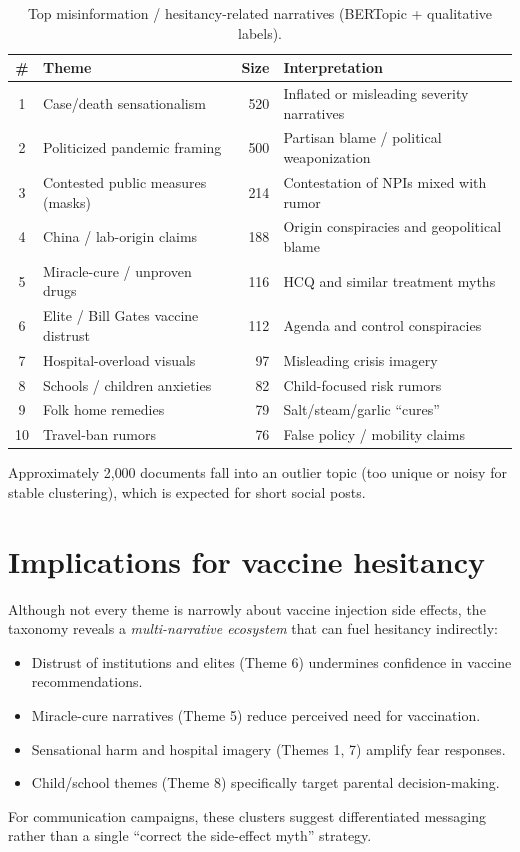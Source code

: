 \begin{table}[H]
\centering
\caption{Top misinformation / hesitancy-related narratives (BERTopic + qualitative labels).}
\label{tab:taxonomy}
\small
\begin{tabular}{clrp{5.2cm}}
\toprule
\# & Theme & Size & Interpretation \\
\midrule
1 & Case/death sensationalism & 520 & Inflated or misleading severity narratives \\
2 & Politicized pandemic framing & 500 & Partisan blame / political weaponization \\
3 & Contested public measures (masks) & 214 & Contestation of NPIs mixed with rumor \\
4 & China / lab-origin claims & 188 & Origin conspiracies and geopolitical blame \\
5 & Miracle-cure / unproven drugs & 116 & HCQ and similar treatment myths \\
6 & Elite / Bill Gates vaccine distrust & 112 & Agenda and control conspiracies \\
7 & Hospital-overload visuals & 97 & Misleading crisis imagery \\
8 & Schools / children anxieties & 82 & Child-focused risk rumors \\
9 & Folk home remedies & 79 & Salt/steam/garlic ``cures'' \\
10 & Travel-ban rumors & 76 & False policy / mobility claims \\
\bottomrule
\end{tabular}
\end{table}

Approximately 2{,}000 documents fall into an outlier topic (too unique or noisy for stable clustering), which is expected for short social posts.

\section{Implications for vaccine hesitancy}

Although not every theme is narrowly about vaccine injection side effects, the taxonomy reveals a \emph{multi-narrative ecosystem} that can fuel hesitancy indirectly:
\begin{itemize}
  \item Distrust of institutions and elites (Theme 6) undermines confidence in vaccine recommendations.
  \item Miracle-cure narratives (Theme 5) reduce perceived need for vaccination.
  \item Sensational harm and hospital imagery (Themes 1, 7) amplify fear responses.
  \item Child/school themes (Theme 8) specifically target parental decision-making.
\end{itemize}
For communication campaigns, these clusters suggest differentiated messaging rather than a single ``correct the side-effect myth'' strategy.

